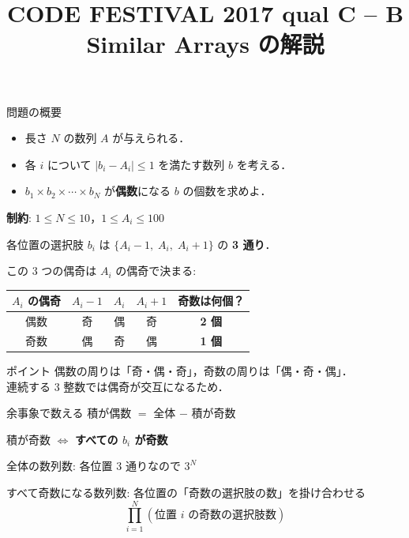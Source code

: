 \documentclass[dvipdfmx,aspectratio=169]{beamer}
\title{CODE FESTIVAL 2017 qual C -- B\\\small Similar Arrays の解説}
\author{}
\date{}
\begin{document}
\begin{frame}
  \titlepage
\end{frame}

\begin{frame}{問題の概要}
  \begin{itemize}
    \item 長さ $N$ の数列 $A$ が与えられる．
    \item 各 $i$ について $|b_i - A_i| \le 1$ を満たす数列 $b$ を考える．
    \item $b_1 \times b_2 \times \cdots \times b_N$ が\textbf{偶数}になる $b$ の個数を求めよ．
  \end{itemize}

  \vspace{1em}
  \textbf{制約}: $1 \le N \le 10$，$1 \le A_i \le 100$
\end{frame}

\begin{frame}{各位置の選択肢}
  $b_i$ は $\{A_i - 1,\; A_i,\; A_i + 1\}$ の \textbf{3 通り}．

  \vspace{0.8em}
  この 3 つの偶奇は $A_i$ の偶奇で決まる:

  \vspace{0.6em}
  \begin{center}
    \begin{tabular}{ccccc}
      \toprule
      $A_i$ の偶奇 & $A_i - 1$ & $A_i$ & $A_i + 1$ & 奇数は何個？ \\
      \midrule
      偶数 & 奇 & 偶 & 奇 & \textbf{2 個} \\
      奇数 & 偶 & 奇 & 偶 & \textbf{1 個} \\
      \bottomrule
    \end{tabular}
  \end{center}

  \vspace{0.6em}
  \begin{block}{ポイント}
    偶数の周りは「奇・偶・奇」，奇数の周りは「偶・奇・偶」．\\
    連続する 3 整数では偶奇が交互になるため．
  \end{block}
\end{frame}

\begin{frame}{余事象で数える}
  積が偶数 $=$ 全体 $-$ 積が奇数

  \vspace{0.8em}
  積が奇数 $\Longleftrightarrow$ \textbf{すべての $b_i$ が奇数}

  \vspace{0.8em}
  全体の数列数: 各位置 3 通りなので $3^N$

  \vspace{0.8em}
  すべて奇数になる数列数:
  各位置の「奇数の選択肢の数」を掛け合わせる
  \[
    \prod_{i=1}^{N} (\text{位置 } i \text{ の奇数の選択肢数})
  \]
\end{frame}
\end{document}
